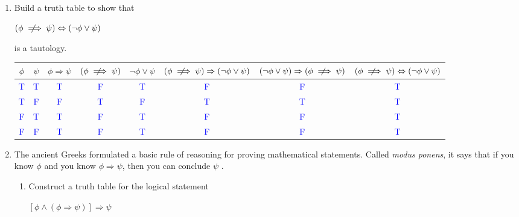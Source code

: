 \documentclass[13.5pt]{article}
\newcommand{\notimplies}{%
  \mathrel{{\ooalign{\hidewidth$\not\phantom{=}$\hidewidth\cr$\implies$}}}}
\begin{document}
\begin{enumerate}
\item{Build a truth table to show that}
\begin{center}
\((\phi \notimplies \psi) \Leftrightarrow (\neg \phi \vee \psi)\)
\end{center}

{is a tautology.}

\begin{center}
\begin{tabular}{ c c c c c c c c}
 \(\phi\) & \(\psi\) & \(\phi \Rightarrow \psi\) & \((\phi \notimplies \psi)\) & \(\neg \phi \vee \psi\) & \((\phi \notimplies \psi) \Rightarrow (\neg \phi \vee \psi)\) & \((\neg \phi \vee \psi) \Rightarrow (\phi \notimplies \psi)\) & \((\phi \notimplies \psi) \Leftrightarrow (\neg \phi \vee \psi)\)\\ 
\hline
 \textcolor{blue}{T} & \textcolor{blue}{T} & \textcolor{blue}{T} & \textcolor{blue}{F} & \textcolor{blue}{T} & \textcolor{blue}{F} & \textcolor{blue}{F} & \textcolor{blue}{T}\\ 
 \textcolor{blue}{T} & \textcolor{blue}{F} & \textcolor{blue}{F} & \textcolor{blue}{T} & \textcolor{blue}{F} & \textcolor{blue}{T} & \textcolor{blue}{T} & \textcolor{blue}{T}\\ 
 \textcolor{blue}{F} & \textcolor{blue}{T} & \textcolor{blue}{T} & \textcolor{blue}{F} & \textcolor{blue}{T} & \textcolor{blue}{F} & \textcolor{blue}{F} & \textcolor{blue}{T}\\ 
 \textcolor{blue}{F} & \textcolor{blue}{F} & \textcolor{blue}{T} & \textcolor{blue}{F} & \textcolor{blue}{T} & \textcolor{blue}{F} & \textcolor{blue}{F} & \textcolor{blue}{T} 
\end{tabular}
\end{center}

\item{The ancient Greeks formulated a basic rule of reasoning for proving mathematical statements. Called \textit{modus ponens}, it says that if you know  \(\phi\) and you know  \(\phi \Rightarrow \psi\), then you can conclude  \(\psi\) .}

\begin{enumerate}
\item {Construct a truth table for the logical statement}
\begin{center}
\([\phi \wedge (\phi \Rightarrow \psi)] \Rightarrow \psi\)
\end{center}


\end{enumerate}
\end{enumerate}
\end{document}
